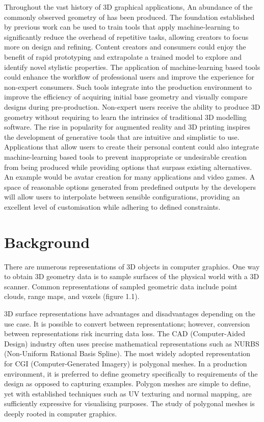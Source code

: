 \documentclass[a4paper, fontsize=15pt, onecolumn]{article} %
\numberwithin{equation}{section} %
\numberwithin{figure}{section} %
\numberwithin{table}{section} %
\begin{document}
Throughout the vast history of 3D graphical applications, An abundance of the commonly observed geometry of has been produced. The foundation established by previous work can be used to train tools that apply machine-learning to significantly reduce the overhead of repetitive tasks, allowing creators to focus more on design and refining. Content creators and consumers could enjoy the benefit of rapid prototyping and extrapolate a trained model to explore and identify novel stylistic properties.
The application of machine-learning based tools could enhance the workflow of professional users and improve the experience for non-expert consumers. Such tools integrate into the production environment to improve the efficiency of acquiring initial base geometry and visually compare designs during pre-production. Non-expert users receive the ability to produce 3D geometry without requiring to learn the intrinsics of traditional 3D modelling software. The rise in popularity for augmented reality and 3D printing inspires the development of generative tools that are intuitive and simplistic to use. Applications that allow users to create their personal content could also integrate machine-learning based tools to prevent inappropriate or undesirable creation from being produced while providing options that surpass existing alternatives. An example would be avatar creation for many applications and video games. A space of reasonable options generated from predefined outputs by the developers will allow users to interpolate between sensible configurations, providing an excellent level of customisation while adhering to defined constraints.

\section{Background}
There are numerous representations of 3D objects in computer graphics. One way to obtain 3D geometry data is to sample surfaces of the physical world with a 3D scanner. Common representations of sampled geometric data include point clouds, range maps, and voxels (figure 1.1).

3D surface representations have advantages and disadvantages depending on the use case. It is possible to convert between representations; however, conversion between representations risk incurring data loss. The CAD (Computer-Aided Design) industry often uses precise mathematical representations such as NURBS (Non-Uniform Rational Basis Spline). The most widely adopted representation for CGI (Computer-Generated Imagery) is polygonal meshes. In a production environment, it is preferred to define geometry specifically to requirements of the design as opposed to capturing examples. Polygon meshes are simple to define, yet with established techniques such as UV texturing and normal mapping, are sufficiently expressive for visualising purposes. The study of polygonal meshes is deeply rooted in computer graphics.
\end{document}
